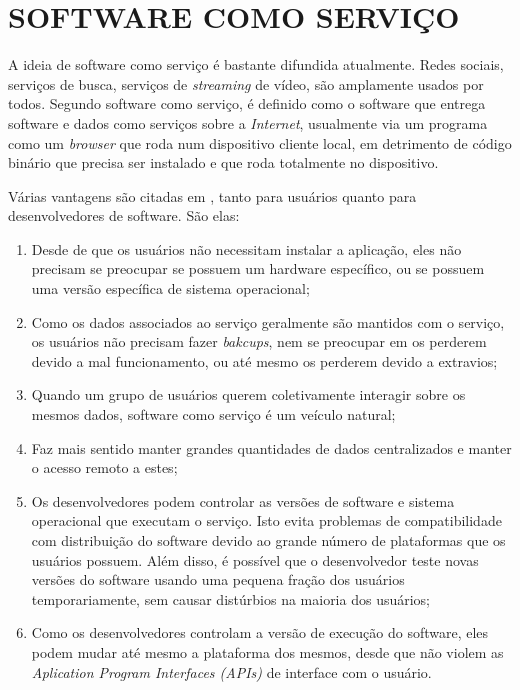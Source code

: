 \section{SOFTWARE COMO SERVIÇO} 

A ideia de software como serviço é bastante difundida atualmente. 
Redes sociais, serviços de busca, serviços de \emph{streaming} de vídeo, são amplamente usados por todos. 
Segundo  software como serviço, é definido como o software que entrega software e dados como serviços sobre a \emph{Internet}, usualmente via um programa como um \emph{browser} que roda num dispositivo cliente local, em detrimento de código binário que precisa ser instalado e que roda totalmente no dispositivo.

Várias vantagens são citadas em , tanto para usuários quanto para desenvolvedores de software. São elas:

\begin{enumerate}
	\item Desde de que os usuários não necessitam instalar a aplicação, eles não precisam se preocupar se possuem um hardware específico, ou se possuem uma versão específica de sistema operacional;
	\item Como os dados associados ao serviço geralmente são mantidos com o serviço, os usuários não precisam fazer \emph{bakcups}, nem se preocupar em os perderem devido a mal funcionamento, ou até mesmo os perderem devido a extravios;
	\item Quando um grupo de usuários querem coletivamente interagir sobre os mesmos dados, software como serviço é um veículo natural;
	\item Faz mais sentido manter grandes quantidades de dados centralizados e manter o acesso remoto a estes;
	\item Os desenvolvedores podem controlar as versões de software e sistema operacional que executam o serviço. Isto evita problemas de compatibilidade com distribuição do software devido ao grande número de plataformas que os usuários possuem. Além disso, é possível que o desenvolvedor teste novas versões do software usando uma pequena fração dos usuários temporariamente, sem causar distúrbios na maioria dos usuários;
	\item Como os desenvolvedores controlam a versão de execução do software, eles podem mudar até mesmo a plataforma dos mesmos, desde que não violem as \emph{Aplication Program Interfaces (APIs)} de interface com o usuário.
\end{enumerate}

